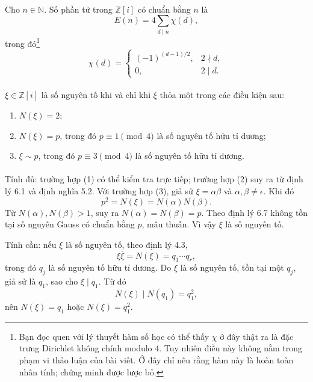 \documentclass[11pt]{article}
\begin{document}
\paragraph{}
Cho \(n\in\mathbb N\). Số phần tử trong \(\mathbb Z[i]\) có chuẩn bằng \(n\)
là
\[
  E(n)=4\sum_{d\mid n}\chi(d),
\]
trong đó\footnote{Bạn đọc quen với lý thuyết hàm số học có thể thấy
\(\chi\) ở đây thật ra là đặc trưng Dirichlet không chính modulo \(4\). Tuy
nhiên điều này không nằm trong phạm vi thảo luận của bài viết. Ở đây chỉ nêu
rằng hàm này là hoàn toàn nhân tính; chứng minh được lược bỏ.}
\[
  \chi(d)=
  \begin{cases}
    (-1)^{(d-1)/2}, & 2\nmid d,\\
    0, & 2\mid d.
  \end{cases}
\]

\paragraph{}
\(\xi\in\mathbb Z[i]\) là số nguyên tố khi và chỉ khi \(\xi\) thỏa một trong
các điều kiện sau:
\begin{enumerate}
  \item \(N(\xi)=2\);
  \item \(N(\xi)=p\), trong đó \(p\equiv1\pmod 4\) là số nguyên tố hữu tỉ
        dương;
  \item \(\xi\sim p\), trong đó \(p\equiv3\pmod 4\) là số nguyên tố hữu tỉ
        dương.
\end{enumerate}

\paragraph{}
Tính đủ: trường hợp (1) có thể kiểm tra trực tiếp; trường hợp (2) suy ra từ
định lý 6.1 và định nghĩa 5.2. Với trường hợp (3), giả sử
\(\xi=\alpha\beta\) và \(\alpha,\beta\ne\epsilon\). Khi đó
\[
  p^2=N(\xi)=N(\alpha)N(\beta).
\]
Từ \(N(\alpha),N(\beta)>1\), suy ra \(N(\alpha)=N(\beta)=p\). Theo định lý
6.7 không tồn tại số nguyên Gauss có chuẩn bằng \(p\), mâu thuẫn. Vì vậy
\(\xi\) là số nguyên tố.

Tính cần: nếu \(\xi\) là số nguyên tố, theo định lý 4.3,
\[
  \xi\bar\xi=N(\xi)=q_1\cdots q_r,
\]
trong đó \(q_j\) là số nguyên tố hữu tỉ dương. Do \(\xi\) là số nguyên tố,
tồn tại một \(q_j\), giả sử là \(q_1\), sao cho \(\xi\mid q_1\). Từ đó
\[
  N(\xi)\mid N(q_1)=q_1^2,
\]
nên \(N(\xi)=q_1\) hoặc \(N(\xi)=q_1^2\).
\end{document}
